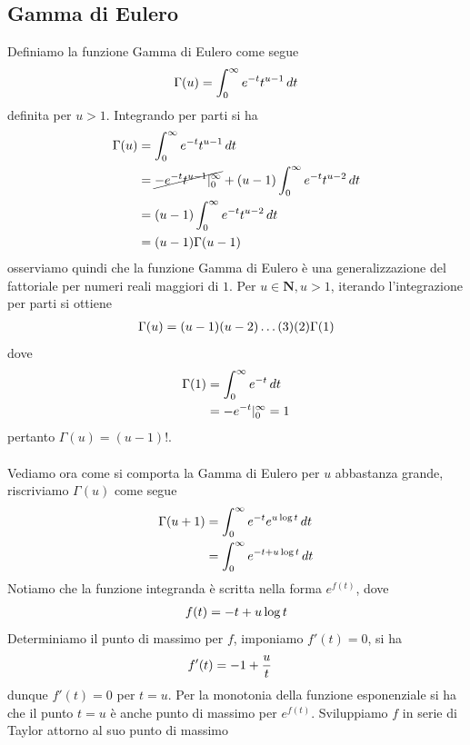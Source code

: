 \documentclass{article}
\begin{document}
\subsection*{Gamma di Eulero}
Definiamo la funzione Gamma di Eulero come segue
\begin{align}
    \Gamma(u) = \int_0^\infty e^{-t}t^{u - 1} \, dt \notag
\end{align}
definita per $u > 1$. Integrando per parti si ha
\begin{align}
    \Gamma(u) &= \int_0^\infty e^{-t}t^{u - 1} \, dt \notag \\
    &= \cancel{-e^{-t}t^{u - 1}|_0^\infty} + (u - 1)\int_0^\infty e^{-t}t^{u - 2} \, dt \notag \\
    &= (u - 1)\int_0^\infty e^{-t}t^{u - 2} \, dt \notag \\
    &= (u - 1)\Gamma(u - 1) \notag
\end{align}
osserviamo quindi che la funzione Gamma di Eulero è una generalizzazione del fattoriale per numeri reali maggiori di $1$. Per $u \in \mathbf{N}, u > 1$, iterando l'integrazione per parti si ottiene
\begin{align}
    \Gamma(u) = (u - 1)(u - 2)\dots(3)(2)\Gamma(1) \notag
\end{align}
dove
\begin{align}
    \Gamma(1) &= \int_0^\infty e^{-t} \, dt \notag \\
    &= -e^{-t}|_0^\infty = 1 \notag
\end{align}
pertanto $\Gamma(u) = (u - 1)!$. \\ \\
Vediamo ora come si comporta la Gamma di Eulero per $u$ abbastanza grande, riscriviamo $\Gamma(u)$ come segue
\begin{align}
    \Gamma(u + 1) &= \int_0^\infty e^{-t}e^{u\log t} \, dt \notag \\
    &= \int_0^\infty e^{-t + u\log t} \, dt \notag
\end{align}
Notiamo che la funzione integranda è scritta nella forma $e^{f(t)}$, dove
\begin{align}
    f(t) = -t + u\log t \notag
\end{align}
Determiniamo il punto di massimo per $f$, imponiamo $f'(t) = 0$, si ha
\begin{align}
    f'(t) &= -1 + \frac{u}{t} \notag
\end{align}
dunque $f'(t) = 0$ per $t = u$. Per la monotonia della funzione esponenziale si ha che il punto $t = u$ è anche punto di massimo per $e^{f(t)}$. Sviluppiamo $f$ in serie di Taylor attorno al suo punto di massimo
\end{document}
